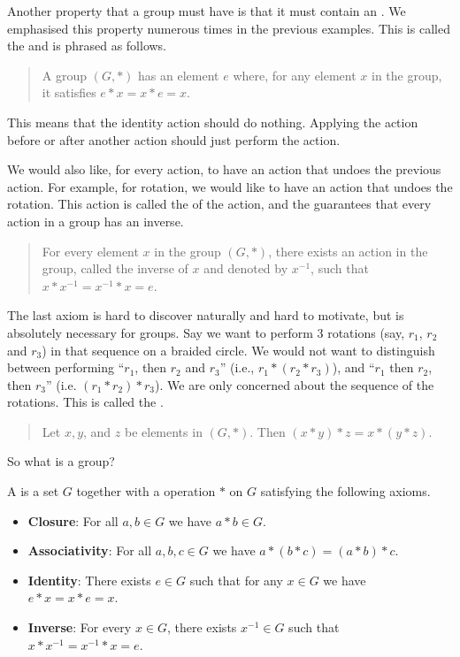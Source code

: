 Another property that a group must have is that it must contain an . We emphasised this property numerous times in the previous examples. This is called the  and is phrased as follows.
\begin{quote}
    A group $(G, \ast)$ has an element $e$ where, for any element $x$ in the group, it satisfies $e \ast x = x \ast e = x$.
\end{quote}
This means that the identity action should do nothing. Applying the action before or after another action should just perform the action.

We would also like, for every action, to have an action that undoes the previous action. For example, for rotation, we would like to have an action that undoes the rotation. This action is called the  of the action, and the  guarantees that every action in a group has an inverse.

\begin{quote}
    For every element $x$ in the group $(G, \ast)$, there exists an action in the group, called the inverse of $x$ and denoted by $x^{-1}$, such that $x \ast x^{-1} = x^{-1} \ast x = e$.
\end{quote}

The last axiom is hard to discover naturally and hard to motivate, but is absolutely necessary for groups. Say we want to perform 3 rotations (say, $r_1$, $r_2$ and $r_3$) in that sequence on a braided circle. We would not want to distinguish between performing ``$r_1$, then $r_2$ and $r_3$'' (i.e., $r_1 \ast (r_2 \ast r_3)$), and ``$r_1$ then $r_2$, then $r_3$'' (i.e. $(r_1 \ast r_2) \ast r_3$). We are only concerned about the sequence of the rotations. This is called the .
\begin{quote}
    Let $x, y$, and $z$ be elements in $(G, \ast)$. Then $(x \ast y) \ast z = x \ast (y \ast z)$.
\end{quote}

\newpage

So what is a group?
\begin{definition}
    A  is a set $G$ together with a operation $\ast$ on $G$ satisfying the following axioms.
    \begin{itemize}
        \item \textbf{Closure}: For all $a, b \in G$ we have $a \ast b \in G$.
        \item \textbf{Associativity}: For all $a, b, c \in G$ we have $a \ast (b \ast c) = (a \ast b) \ast c$.
        \item \textbf{Identity}: There exists $e \in G$ such that for any $x \in G$ we have $e \ast x = x \ast e = x$.
        \item \textbf{Inverse}: For every $x \in G$, there exists $x^{-1} \in G$ such that $x \ast x^{-1} = x^{-1} \ast x = e$.
    \end{itemize}
\end{definition}

